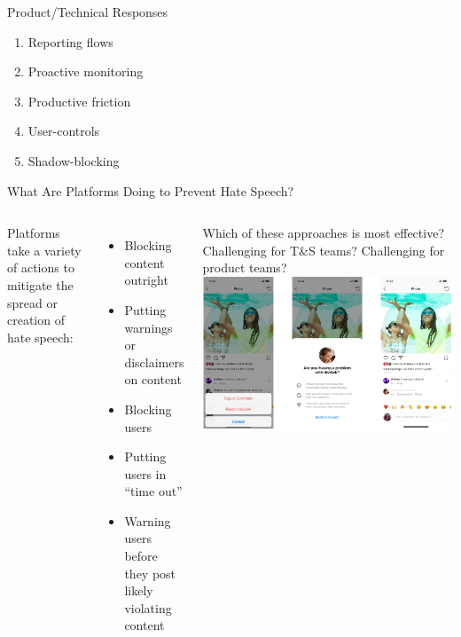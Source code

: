 \documentclass[nobackground,dvipsnames,table,aspectratio=169]{beamer}
\begin{document}
\begin{frame}{Product/Technical Responses}
    \large
    \begin{enumerate}
        \item Reporting flows
        \item Proactive monitoring
        \item Productive friction
        \item User-controls
        \item Shadow-blocking
    \end{enumerate}
\end{frame}

\begin{frame}{What Are Platforms Doing to Prevent Hate Speech?}
    \begin{columns}
            \footnotesize
            Platforms take a variety of actions to mitigate the spread or creation of hate speech:\\
            \begin{itemize}
                \item Blocking content outright
                \item Putting warnings or disclaimers on content
                \item Blocking users
                \item Putting users in “time out”
                \item Warning users before they post likely violating content
            \end{itemize}
            
            Which of these approaches is most effective? Challenging for T\&S teams? Challenging for product teams?
            \includegraphics[width=\textwidth]{shadow-blocking}
    \end{columns}
\end{frame}
\end{document}
